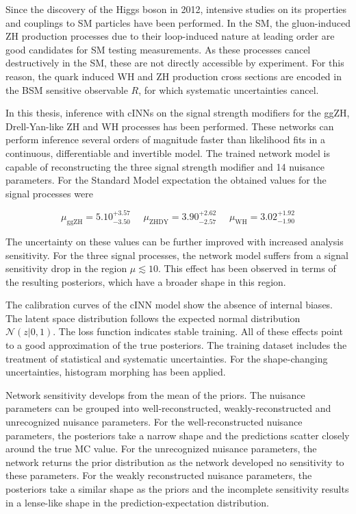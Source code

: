 \label{sec:conclusion}

Since the discovery of the Higgs boson in 2012, intensive studies on its properties and couplings to SM particles have been performed. In the SM, the gluon-induced ZH production processes due to their loop-induced nature at leading order are good candidates for SM testing measurements. As these processes cancel destructively in the SM, these are not directly accessible by experiment. For this reason, the quark induced WH and ZH production cross sections are encoded in the BSM sensitive observable $R$, for which systematic uncertainties cancel.

In this thesis, inference with cINNs on the signal strength modifiers for the ggZH, Drell-Yan-like ZH and WH processes has been performed. These networks can perform inference several orders of magnitude faster than likelihood fits in a continuous, differentiable and invertible model. The trained network model is capable of reconstructing the three signal strength modifier and 14 nuisance parameters.
For the Standard Model expectation the obtained values for the signal processes were

\begin{equation*}
		\mu_\text{ggZH} = 5.10^{+3.57}_{-3.50} \, \, \quad \mu_\text{ZHDY} = 3.90^{+2.62}_{-2.57} \, \, \quad \mu_\text{WH} = 3.02^{+1.92}_{-1.90}
\end{equation*}

The uncertainty on these values can be further improved with increased analysis sensitivity. For the three signal processes, the network model suffers from a signal sensitivity drop in the region $\mu\lesssim10$. This effect has been observed in terms of the resulting posteriors, which have a broader shape in this region.

The calibration curves of the cINN model show the absence of internal biases. The latent space distribution follows the expected normal distribution $\mathcal{N}(z | 0,1)$. The loss function indicates stable training. All of these effects point to a good approximation of the true posteriors. The training dataset includes the treatment of statistical and systematic uncertainties. For the shape-changing uncertainties, histogram morphing has been applied.

Network sensitivity develops from the mean of the priors. The nuisance parameters can be grouped into well-reconstructed, weakly-reconstructed and unrecognized nuisance parameters. For the well-reconstructed nuisance parameters, the posteriors take a narrow shape and the predictions scatter closely around the true MC value. For the unrecognized nuisance parameters, the network returns the prior distribution as the network developed no sensitivity to these parameters. For the weakly reconstructed nuisance parameters, the posteriors take a similar shape as the priors and the incomplete sensitivity results in a lense-like shape in the prediction-expectation distribution.

